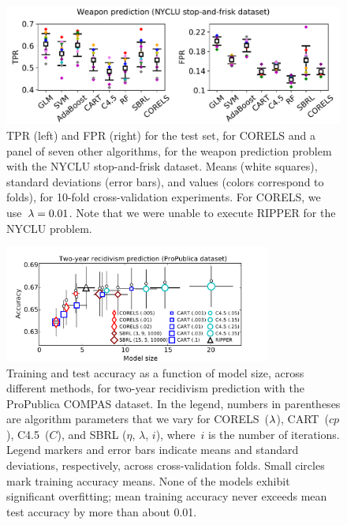 \begin{figure}[t!]
\begin{center}
\includegraphics[trim={2mm, 10mm, 2mm, 0mm},
width=\textwidth]{figs/compare-weapon.pdf}
\end{center}
\caption{TPR (left) and FPR (right) for the test set,
for CORELS and a panel of seven other algorithms,
for the weapon prediction problem with the NYCLU stop-and-frisk dataset.
%
Means (white squares),
standard deviations (error bars),
and values (colors correspond to folds),
for 10-fold cross-validation experiments.
%
For CORELS, we use~${{\lambda}=0.01}$.
%
Note that we were unable to execute RIPPER for the NYCLU problem.
}
\label{fig:weapon-comparison}
\end{figure}
%
\begin{figure}[t!]
\begin{center}
\includegraphics[trim={12mm, 5mm, 24mm, 5mm},
width=0.78\textwidth]{figs/compas-sparsity-training.pdf}
%
\end{center}
\caption{Training and test accuracy as a function of model size, across different methods,
for two-year recidivism prediction with the ProPublica COMPAS dataset.
%
In the legend, numbers in parentheses are algorithm parameters that we vary
for CORELS~(${\lambda}$), CART~($cp$), C4.5~($C$), and SBRL ($\eta$, $\lambda$, $i$),
where~$i$ is the number of iterations.
%
Legend markers and error bars indicate means and standard deviations,
respectively, across cross-validation folds.
%
Small circles mark training accuracy means.
%
None of the models exhibit significant overfitting;
mean training accuracy never exceeds mean test accuracy
by more than about 0.01.
}
\label{fig:sparsity-compas}
\end{figure}

